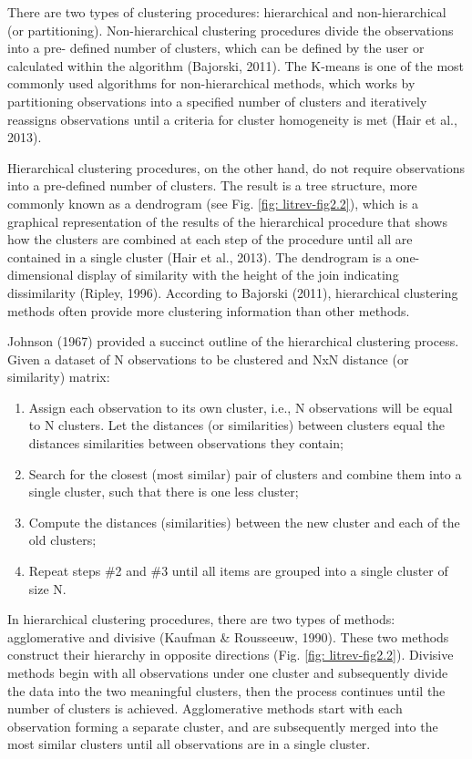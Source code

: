 There are two types of clustering procedures: hierarchical and non-hierarchical (or partitioning). Non-hierarchical clustering procedures divide the observations into a pre- defined number of clusters, which can be defined by the user or calculated within the algorithm (Bajorski, 2011). The K-means is one of the most commonly used algorithms for non-hierarchical methods, which works by partitioning observations into a specified number of clusters and iteratively reassigns observations until a criteria for cluster homogeneity is met (Hair et al., 2013).

Hierarchical clustering procedures, on the other hand, do not require observations into a pre-defined number of clusters. The result is a tree structure, more commonly known as a dendrogram (see Fig. \ref{fig: litrev-fig2.2}), which is a graphical representation of the results of the hierarchical procedure that shows how the clusters are combined at each step of the procedure until all are contained in a single cluster (Hair et al., 2013). The dendrogram is a one-dimensional display of similarity with the height of the join indicating dissimilarity (Ripley, 1996). According to Bajorski (2011), hierarchical clustering methods often provide more clustering information than other methods.

Johnson (1967) provided a succinct outline of the hierarchical clustering process. Given a dataset of N observations to be clustered and NxN distance (or similarity) matrix:

\begin{enumerate}
	\item Assign each observation to its own cluster, i.e., N observations will be equal to N clusters. Let the distances (or similarities) between clusters equal the distances similarities between observations they contain;
	\item Search for the closest (most similar) pair of clusters and combine them into a single cluster, such that there is one less cluster;
	\item Compute the distances (similarities) between the new cluster and each of the old clusters;
	\item Repeat steps \#2 and \#3 until all items are grouped into a single cluster of size N.
\end{enumerate}

In hierarchical clustering procedures, there are two types of methods: agglomerative and divisive (Kaufman \& Rousseeuw, 1990). These two methods construct their hierarchy in opposite directions (Fig. \ref{fig: litrev-fig2.2}). Divisive methods begin with all observations under one cluster and subsequently divide the data into the two meaningful clusters, then the process continues until the number of clusters is achieved. Agglomerative methods start with each observation forming a separate cluster, and are subsequently merged into the most similar clusters until all observations are in a single cluster.

